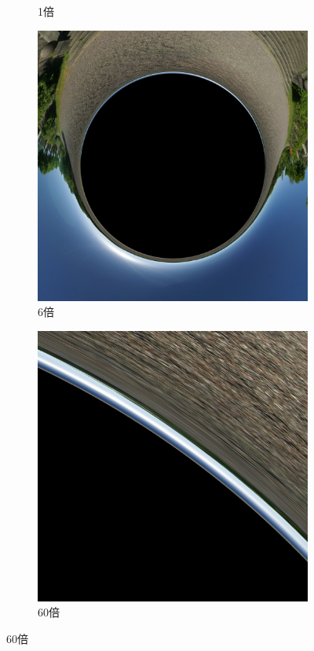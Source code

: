 \documentclass{beamer}
\begin{document}
\begin{frame}
\begin{figure}[H]
\begin{subfigure}{.24\textwidth}
            \caption{1倍}
            \label{fig:blackness_test}
        \end{subfigure}
        \begin{subfigure}{.24\textwidth}
            \centering
            \includegraphics[width=.8\linewidth]{images/zoomin_6x.png}
            \caption{6倍}
            \label{fig:blackness_test}
        \end{subfigure}
        \begin{subfigure}{.24\textwidth}
            \centering
            \includegraphics[width=.8\linewidth]{images/zoomin_60x.png}
            \caption{60倍}
            \label{fig:blackness_test}
        \end{subfigure}


\end{figure}
\end{frame}
\end{document}
